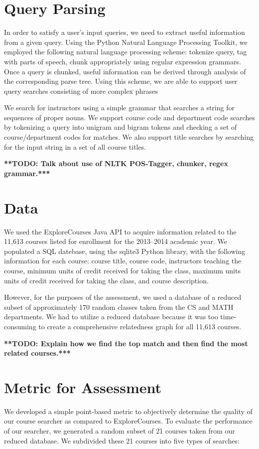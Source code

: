 \documentclass[12pt]{article}
\newcommand{\todo}[1]{{\Large \bf ***TODO: #1***}}
\begin{document}
\section*{Query Parsing}
In order to satisfy a user's input queries, we need to extract useful
information from a given query. Using the Python Natural Language
Processing Toolkit, we employed the following natural language
processing scheme: tokenize query, tag with parts of speech, chunk
appropriately using regular expression grammars. Once a query is
chunked, useful information can be derived through analysis of the
corresponding parse tree. Using this scheme, we are able to support
user query searches consisting of more complex phrases

We search for instructors using a simple grammar that searches a
string for sequences of proper nouns. We support course code and
department code searches by tokenizing a query into unigram and bigram
tokens and checking a set of course/department codes for matches. We
also support title searches by searching for the input string in a set
of all course titles.

\todo{Talk about use of NLTK POS-Tagger, chunker, regex grammar.}

\section*{Data}
We used the ExploreCourses Java API to acquire information related to
the 11,613 courses listed for enrollment for the 2013–2014 academic
year. We populated a SQL datebase, using the sqlite3 Python library,
with the following information for each course: course title, course
code, instructors teaching the course, minimum units of credit
received for taking the class, maximum units units of credit received
for taking the class, and course description.

However, for the purposes of the assessment, we used a database of a
reduced subset of approximately 170 random classes taken from the CS
and MATH departments. We had to utilize a reduced database because it
was too time-consuming to create a comprehensive relatedness graph for
all 11,613 courses.

\todo{Explain how we find the top match and then find the most related
courses.}

\section*{Metric for Assessment}
We developed a simple point-based metric to objectively determine the
quality of our course searcher as compared to ExploreCourses. To
evaluate the performance of our searcher, we generated a random subset
of 21 courses taken from our reduced database. We subdivided these 21
courses into five types of searches: 
\end{document}
